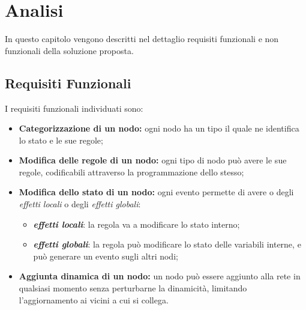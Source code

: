 \documentclass{memoir}
\begin{document}

\chapter{Analisi}\label{ch:analisi}

In questo capitolo vengono descritti nel dettaglio requisiti funzionali e non funzionali della soluzione proposta.

\section{Requisiti Funzionali}

I requisiti funzionali individuati sono:
\begin{itemize}
\item \textbf{Categorizzazione di un nodo:} ogni nodo ha un tipo il quale ne identifica lo stato e le sue regole;
\item \textbf{Modifica delle regole di un nodo:} ogni tipo di nodo può avere le sue regole, codificabili attraverso la programmazione dello stesso;
\item \textbf{Modifica dello stato di un nodo:} ogni evento permette di avere o degli \textit{effetti locali} o degli \textit{effetti globali}:
	\begin{itemize}
	\item \textit{\textbf{effetti locali}}: la regola va a modificare lo stato interno;
	\item \textit{\textbf{effetti globali}}: la regola può modificare lo stato delle variabili interne, e può generare un evento sugli altri nodi;
	\end{itemize}
\item \textbf{Aggiunta dinamica di un nodo:} un nodo può essere aggiunto alla rete in qualsiasi momento senza perturbarne la dinamicità, limitando l'aggiornamento ai vicini a cui si collega.
\end{itemize}
\end{document}
